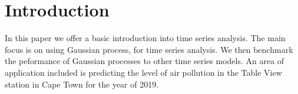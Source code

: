 \section{Introduction}
   
   In this paper we offer a basic introduction into time series analysis. The main focus is on using Gaussian process, for time series analysis. We then benchmark the peformance of Gaussian processes to other time series models. An area of application included is predicting the level of air pollution in the Table View station in Cape Town for the year of 2019. 
   
